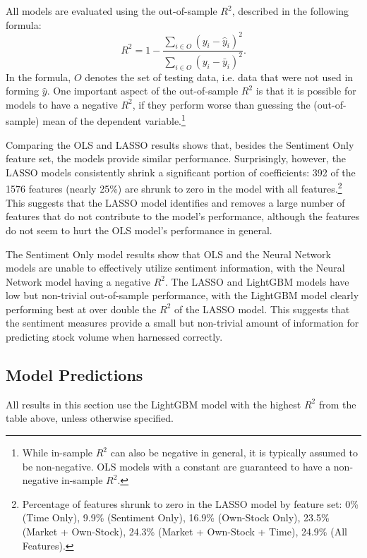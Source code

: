 \documentclass[12pt]{article}
\begin{document}
All models are evaluated using the out-of-sample $R^2$, described in the following formula:
\begin{equation}
    R^2 = 1 - \frac{\sum_{i\in O} (y_i - \hat{y}_i)^2}{\sum_{i\in O} (y_i - \bar{y}_i)^2}.
\end{equation}
In the formula, $O$ denotes the set of testing data, i.e. data that were not used in forming $\hat{y}$. One important aspect of the out-of-sample $R^2$ is that it is possible for models to have a negative $R^2$, if they perform worse than guessing the (out-of-sample) mean of the dependent variable.\footnote{While in-sample $R^2$ can also be negative in general, it is typically assumed to be non-negative. OLS models with a constant are guaranteed to have a non-negative in-sample $R^2$.}



Comparing the OLS and LASSO results shows that, besides the Sentiment Only feature set, the models provide similar performance. Surprisingly, however, the LASSO models consistently shrink a significant portion of coefficients: 392 of the 1576 features (nearly 25\%) are shrunk to zero in the model with all features.\footnote{Percentage of features shrunk to zero in the LASSO model by feature set: 0\% (Time Only), 9.9\% (Sentiment Only), 16.9\% (Own-Stock Only), 23.5\% (Market + Own-Stock), 24.3\% (Market + Own-Stock + Time), 24.9\% (All Features).} This suggests that the LASSO model identifies and removes a large number of features that do not contribute to the model's performance, although the features do not seem to hurt the OLS model's performance in general.

The Sentiment Only model results show that OLS and the Neural Network models are unable to effectively utilize sentiment information, with the Neural Network model having a negative $R^2$. The LASSO and LightGBM models have low but non-trivial out-of-sample performance, with the LightGBM model clearly performing best at over double the $R^2$ of the LASSO model. This suggests that the sentiment measures provide a small but non-trivial amount of information for predicting stock volume when harnessed correctly.

\subsection{Model Predictions}
All results in this section use the LightGBM model with the highest $R^2$ from the table above, unless otherwise specified.
\end{document}
